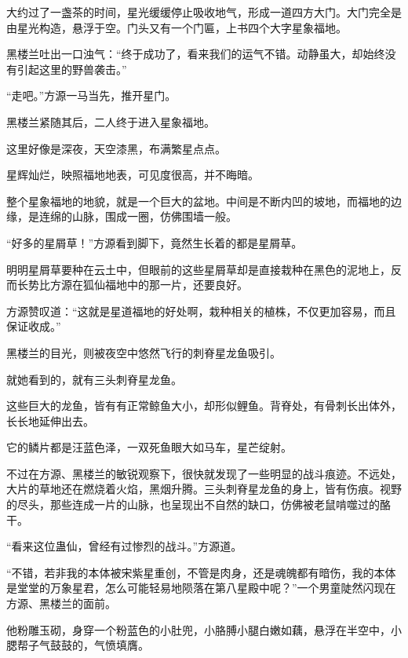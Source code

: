 \begin{this_body}
大约过了一盏茶的时间，星光缓缓停止吸收地气，形成一道四方大门。大门完全是由星光构造，悬浮于空。门头又有一个门匾，上书四个大字星象福地。

黑楼兰吐出一口浊气：“终于成功了，看来我们的运气不错。动静虽大，却始终没有引起这里的野兽袭击。”

“走吧。”方源一马当先，推开星门。

黑楼兰紧随其后，二人终于进入星象福地。

这里好像是深夜，天空漆黑，布满繁星点点。

星辉灿烂，映照福地地表，可见度很高，并不晦暗。

整个星象福地的地貌，就是一个巨大的盆地。中间是不断内凹的坡地，而福地的边缘，是连绵的山脉，围成一圈，仿佛围墙一般。

“好多的星屑草！”方源看到脚下，竟然生长着的都是星屑草。

明明星屑草要种在云土中，但眼前的这些星屑草却是直接栽种在黑色的泥地上，反而长势比方源在狐仙福地中的那一片，还要良好。

方源赞叹道：“这就是星道福地的好处啊，栽种相关的植株，不仅更加容易，而且保证收成。”

黑楼兰的目光，则被夜空中悠然飞行的刺脊星龙鱼吸引。

就她看到的，就有三头刺脊星龙鱼。

这些巨大的龙鱼，皆有有正常鲸鱼大小，却形似鲤鱼。背脊处，有骨刺长出体外，长长地延伸出去。

它的鳞片都是汪蓝色泽，一双死鱼眼大如马车，星芒绽射。

不过在方源、黑楼兰的敏锐观察下，很快就发现了一些明显的战斗痕迹。不远处，大片的草地还在燃烧着火焰，黑烟升腾。三头刺脊星龙鱼的身上，皆有伤痕。视野的尽头，那些连成一片的山脉，也呈现出不自然的缺口，仿佛被老鼠啃噬过的酪干。

“看来这位蛊仙，曾经有过惨烈的战斗。”方源道。

“不错，若非我的本体被宋紫星重创，不管是肉身，还是魂魄都有暗伤，我的本体是堂堂的万象星君，怎么可能轻易地陨落在第八星殿中呢？”一个男童陡然闪现在方源、黑楼兰的面前。

他粉雕玉砌，身穿一个粉蓝色的小肚兜，小胳膊小腿白嫩如藕，悬浮在半空中，小腮帮子气鼓鼓的，气愤填膺。

\end{this_body}

